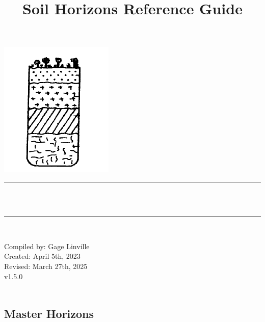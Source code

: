 \documentclass[12pt]{exam}
\title{Soil Horizons Reference Guide}			    %
\makeatletter
\newcommand{\semanticversion}{v1.5.0}               %
\newcommand{\studentone}{Gage Linville}			    %
\newcommand{\creationdate}{April 5th, 2023}         %
\newcommand{\revisiondate}{March 27th, 2025}        %
\def\maketitle{%
  \null
  \thispagestyle{empty}
  \begin{center}\leavevmode
       \normalfont
       \includegraphics[width=0.20\columnwidth]{figures/Image.png}
	\rule{\linewidth}{0.2 mm} \\[0.4 cm]
	{ \huge \bfseries \@title}\\
	\rule{\linewidth}{0.2 mm} \\[0.4 cm]

	\begin{minipage}{0.5\textwidth}
		 \begin{center}\large
			Compiled by: \studentone\\
            Created: \creationdate\\
            Revised: \revisiondate\\
            \semanticversion\\
            \
			\end{center}
			\end{minipage}
   \end{center}
   \vfill
   \null
   \cleardoublepage
  }
\makeatother
\begin{document}
\maketitle
\let\cleardoublepage\clearpage
\sloppy


\begin{center}
   \section*{Master Horizons}
\end{center}
 \hrulefill 
 
\end{document}
